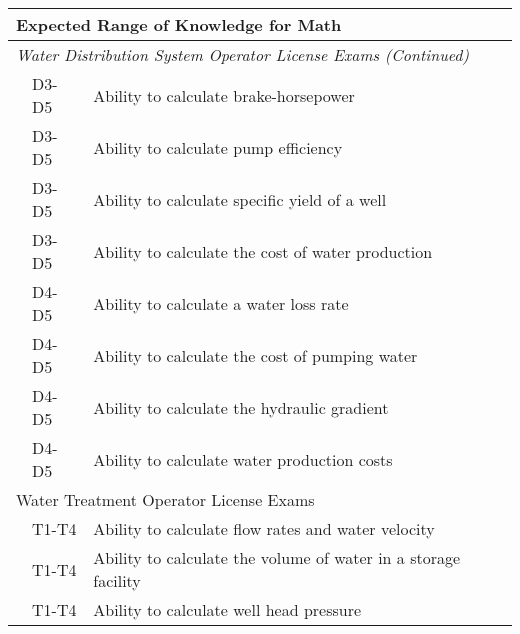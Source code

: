 \begin{table}[H]
\begin{tabular}{| m{1cm} | m{1cm} | m{12cm} |}
\hline
\multicolumn{3}{|l|}{\textbf{Expected   Range of Knowledge for Math}}                                                                      \\ \hline
\multicolumn{3}{|l|}{\textit{Water   Distribution System Operator License Exams (Continued)}}                                                          \\ \hline
\multicolumn{1}{l|}{} & \multicolumn{1}{l|}{D3-D5} & Ability to calculate   brake-horsepower                                      \\ \cline{2-3} 
\multicolumn{1}{l|}{} & \multicolumn{1}{l|}{D3-D5} & Ability to calculate   pump efficiency                                       \\ \cline{2-3} 
\multicolumn{1}{l|}{} & \multicolumn{1}{l|}{D3-D5} & Ability to calculate   specific yield of a well                              \\ \cline{2-3} 
\multicolumn{1}{l|}{} & \multicolumn{1}{l|}{D3-D5} & Ability to calculate   the cost of water production                          \\ \cline{2-3} 
\multicolumn{1}{l|}{} & \multicolumn{1}{l|}{D4-D5} & Ability to calculate a water loss rate                                       \\ \cline{2-3} 
\multicolumn{1}{l|}{} & \multicolumn{1}{l|}{D4-D5} & Ability to calculate the cost of pumping   water                             \\ \cline{2-3} 
\multicolumn{1}{l|}{} & \multicolumn{1}{l|}{D4-D5} & Ability to calculate the hydraulic gradient                                  \\ \cline{2-3} 
\multicolumn{1}{l|}{} & \multicolumn{1}{l|}{D4-D5} & Ability to calculate water production costs                                  \\ \hline
\multicolumn{3}{|l|}{Water   Treatment Operator License Exams}                                                                    \\ \hline
\multicolumn{1}{l|}{} & \multicolumn{1}{l|}{T1-T4} & Ability to calculate   flow rates and water velocity                         \\ \cline{2-3} 
\multicolumn{1}{l|}{} & \multicolumn{1}{l|}{T1-T4} & Ability to calculate   the volume of water in a storage facility             \\ \cline{2-3} 
\multicolumn{1}{l|}{} & \multicolumn{1}{l|}{T1-T4} & Ability to calculate   well head pressure                                    \\ \cline{2-3} 

\end{tabular}
\end{table}
